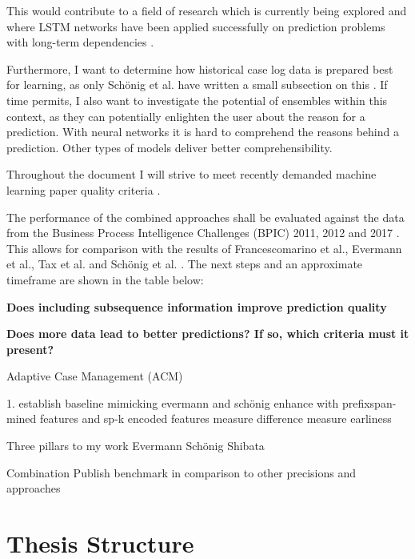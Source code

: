 This would contribute to a field of research which is currently being explored and where LSTM networks have been applied successfully on prediction problems with long-term dependencies \cite{evermann2016, tax2017, schoenig2018, graves2005}.

Furthermore, I want to determine how historical case log data is prepared best for learning, as only Schönig et al. have written a small subsection on this \cite{schoenig2018}.
If time permits, I also want to investigate the potential of ensembles within this context, as they can potentially enlighten the user about the reason for a prediction.
With neural networks it is hard to comprehend the reasons behind a prediction.
Other types of models deliver better comprehensibility.

Throughout the document I will strive to meet recently demanded machine learning paper quality criteria \cite{lipton2018}.

The performance of the combined approaches shall be evaluated against the data from the Business Process Intelligence Challenges (BPIC) 2011, 2012 and 2017 \cite{BPIC2011, BPIC2012, BPIC2017}. This allows for comparison with the results of Francescomarino et al., Evermann et al., Tax et al. and Schönig et al. \cite{francescomarino2018, evermann2016, tax2017, schoenig2018}.
The next steps and an approximate timeframe are shown in the table below:\\[1em]


\textbf{Does including subsequence information improve prediction quality}

\textbf{Does more data lead to better predictions? If so, which criteria must it present?}

Adaptive Case Management (ACM)

1. establish baseline mimicking evermann and schönig
enhance with prefixspan-mined features and sp-k encoded features
measure difference
measure earliness

Three pillars to my work
Evermann
Schönig
Shibata

Combination
Publish benchmark in comparison to other precisions and approaches

\section{Thesis Structure}\label{sec:intro:structure}


